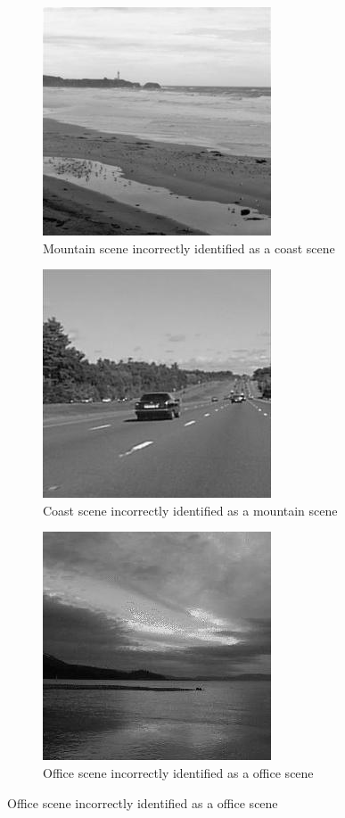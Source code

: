 \begin{homeworkProblem}
  \begin{figure}[H]
    \begin{subfigure}{0.5\textwidth}
      \centering
      \caption{Mountain scene incorrectly identified as a coast scene}
      \includegraphics[width=.5\linewidth]{./images/own/coast_mountain_1.jpg}
    \end{subfigure}%
    \begin{subfigure}{0.5\textwidth}
      \centering
      \caption{Coast scene incorrectly identified as a mountain scene}
      \includegraphics[width=.5\linewidth]{./images/own/highway_coast_1.jpg}
    \end{subfigure}
    \begin{subfigure}{0.5\textwidth}
      \centering
      \caption{Office scene incorrectly identified as a office scene}
      \includegraphics[width=.5\linewidth]{./images/own/coast_office_1.jpg}

\end{subfigure}
\end{figure}
\end{homeworkProblem}

